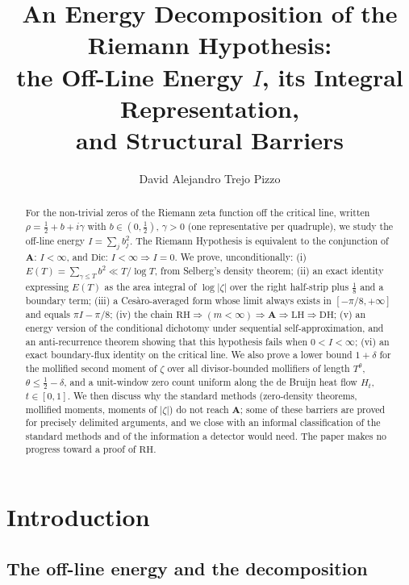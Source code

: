 \documentclass[11pt]{amsart}
\title[An Energy Decomposition of RH]{An Energy Decomposition of the Riemann Hypothesis:\\
the Off-Line Energy $I$, its Integral Representation,\\
and Structural Barriers}
\author{David Alejandro Trejo Pizzo}
\theoremstyle{plain}
\theoremstyle{definition}
\theoremstyle{remark}
\newcommand{\RH}{\mathrm{RH}}
\newcommand{\LH}{\mathrm{LH}}
\renewcommand{\DH}{\mathrm{DH}}
\newcommand{\Dic}{\mathrm{Dic}}
\newcommand{\Aax}{\mathbf{A}}
\begin{document}
\begin{abstract}
For the non-trivial zeros of the Riemann zeta function off the critical line, written $\rho=\tfrac12+b+i\gamma$ with $b\in(0,\tfrac12)$, $\gamma>0$ (one representative per quadruple), we study the off-line energy $I=\sum_j b_j^2$. The Riemann Hypothesis is equivalent to the conjunction of $\Aax$: $I<\infty$, and $\Dic$: $I<\infty\Rightarrow I=0$. We prove, unconditionally: (i) $E(T)=\sum_{\gamma\le T}b^2\ll T/\log T$, from Selberg's density theorem; (ii) an exact identity expressing $E(T)$ as the area integral of $\log|\zeta|$ over the right half-strip plus $\tfrac18$ and a boundary term; (iii) a Ces\`aro-averaged form whose limit always exists in $[-\pi/8,+\infty]$ and equals $\pi I-\pi/8$; (iv) the chain $\RH\Rightarrow(m<\infty)\Rightarrow\Aax\Rightarrow\LH\Rightarrow\DH$; (v) an energy version of the conditional dichotomy under sequential self-approximation, and an anti-recurrence theorem showing that this hypothesis fails when $0<I<\infty$; (vi) an exact boundary-flux identity on the critical line. We also prove a lower bound $1+\delta$ for the mollified second moment of $\zeta$ over all divisor-bounded mollifiers of length $T^\theta$, $\theta\le\tfrac12-\delta$, and a unit-window zero count uniform along the de Bruijn heat flow $H_t$, $t\in[0,1]$. We then discuss why the standard methods (zero-density theorems, mollified moments, moments of $|\zeta|$) do not reach $\Aax$; some of these barriers are proved for precisely delimited arguments, and we close with an informal classification of the standard methods and of the information a detector would need. The paper makes no progress toward a proof of $\RH$.
\end{abstract}

\maketitle

\tableofcontents
\newpage

\section{Introduction}\label{sec:intro}

\subsection{The off-line energy and the decomposition}
\end{document}
